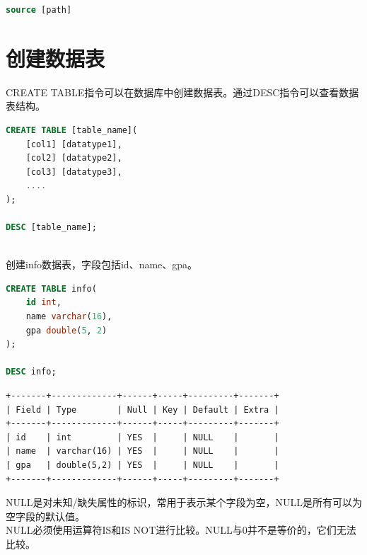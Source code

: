 \documentclass[12pt, openany, oneside]{book}
\begin{document}
\begin{lstlisting}[language=SQL]
source [path]
\end{lstlisting}

\vspace{0.5cm}

\section{创建数据表}

CREATE TABLE指令可以在数据库中创建数据表。通过DESC指令可以查看数据表结构。

\vspace{-0.5cm}

\begin{lstlisting}[language=SQL]
CREATE TABLE [table_name](
    [col1] [datatype1],
    [col2] [datatype2],
    [col3] [datatype3],
    ....
);

DESC [table_name];
\end{lstlisting}

\vspace{0.5cm}

\\

创建info数据表，字段包括id、name、gpa。

\vspace{-0.5cm}

\begin{lstlisting}[language=SQL]
CREATE TABLE info(
    id int, 
    name varchar(16), 
    gpa double(5, 2)
);

DESC info;
\end{lstlisting}

\begin{tcolorbox}
	\begin{verbatim}
+-------+-------------+------+-----+---------+-------+
| Field | Type        | Null | Key | Default | Extra |
+-------+-------------+------+-----+---------+-------+
| id    | int         | YES  |     | NULL    |       |
| name  | varchar(16) | YES  |     | NULL    |       |
| gpa   | double(5,2) | YES  |     | NULL    |       |
+-------+-------------+------+-----+---------+-------+
	\end{verbatim}
\end{tcolorbox}

NULL是对未知/缺失属性的标识，常用于表示某个字段为空，NULL是所有可以为空字段的默认值。\\

NULL必须使用运算符IS和IS NOT进行比较。NULL与0并不是等价的，它们无法比较。\\
\end{document}

